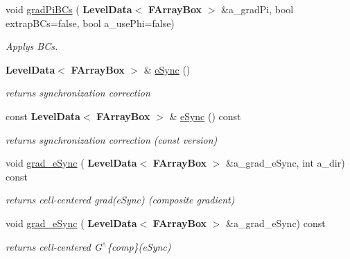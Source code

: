 \begin{DoxyCompactItemize}
\mbox{\label{class_projector_a1cb34981c45964fa244da99d8007136d}} 
void \hyperlink{class_projector_a1cb34981c45964fa244da99d8007136d}{grad\+Pi\+B\+Cs} (\textbf{ Level\+Data}$<$ \textbf{ F\+Array\+Box} $>$ \&a\+\_\+grad\+Pi, bool extrap\+B\+Cs=false, bool a\+\_\+use\+Phi=false)
\begin{DoxyCompactList}\small\item\em Applys B\+Cs. \end{DoxyCompactList}\item 
\mbox{\label{class_projector_ab850ed86d8cf58160b011c6f78a1b388}} 
\textbf{ Level\+Data}$<$ \textbf{ F\+Array\+Box} $>$ \& \hyperlink{class_projector_ab850ed86d8cf58160b011c6f78a1b388}{e\+Sync} ()
\begin{DoxyCompactList}\small\item\em returns synchronization correction \end{DoxyCompactList}\item 
\mbox{\label{class_projector_a1ef6630a08e20d17f7471f6eca699315}} 
const \textbf{ Level\+Data}$<$ \textbf{ F\+Array\+Box} $>$ \& \hyperlink{class_projector_a1ef6630a08e20d17f7471f6eca699315}{e\+Sync} () const
\begin{DoxyCompactList}\small\item\em returns synchronization correction (const version) \end{DoxyCompactList}\item 
\mbox{\label{class_projector_afe61ff1a55d247df28839c60694f6418}} 
void \hyperlink{class_projector_afe61ff1a55d247df28839c60694f6418}{grad\+\_\+e\+Sync} (\textbf{ Level\+Data}$<$ \textbf{ F\+Array\+Box} $>$ \&a\+\_\+grad\+\_\+e\+Sync, int a\+\_\+dir) const
\begin{DoxyCompactList}\small\item\em returns cell-\/centered grad(e\+Sync) (composite gradient) \end{DoxyCompactList}\item 
\mbox{\label{class_projector_a0fa40963ac03b1d31ef0235a218c1289}} 
void \hyperlink{class_projector_a0fa40963ac03b1d31ef0235a218c1289}{grad\+\_\+e\+Sync} (\textbf{ Level\+Data}$<$ \textbf{ F\+Array\+Box} $>$ \&a\+\_\+grad\+\_\+e\+Sync) const
\begin{DoxyCompactList}\small\item\em returns cell-\/centered G$^\wedge$\{comp\}(e\+Sync) \end{DoxyCompactList}\item 

\end{DoxyCompactItemize}
